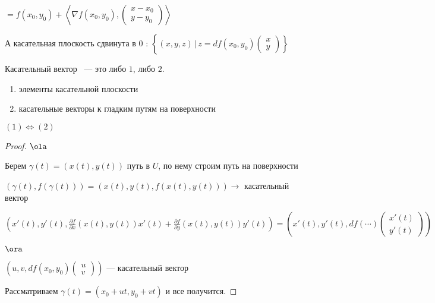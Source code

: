 $ = f(x_0, y_0) + \left \langle \nabla f(x_0, y_0), \begin{pmatrix}
    x - x_0 \\
    y - y_0
\end{pmatrix} \right \rangle$

А касательная плоскость сдвинута в 0 : $\left \{ (x, y, z) \, | \, z = df(x_0, y_0) \begin{pmatrix}
    x\\
    y
\end{pmatrix} \right \}$

\quad

\begin{definition}
    Касательный вектор ~--- это либо $1$, либо $2$.
   \begin{enumerate}
       \item элементы касательной плоскости
       \item касательные векторы к гладким путям на поверхности
    \end{enumerate}
\end{definition}

\begin{theorem}
    $(1) \Longleftrightarrow (2)$
\end{theorem}

\begin{proof}

    $\ola$ 

    Берем $\gamma(t) = (x(t), y(t))$ путь в $U$, по нему строим путь на поверхности 

    $(\gamma(t), f(\gamma(t))) = (x(t), y(t), f(x(t), y(t))) \rightarrow$ касательный вектор

    $(x'(t), y'(t), \frac{\partial f}{\partial x}(x(t), y(t)) x'(t) + \frac{\partial f}{\partial y} (x(t), y(t)) y'(t)) = (x'(t), y'(t), df(\cdots) \begin{pmatrix}
        x'(t)\\
        y'(t)
    \end{pmatrix})$

    $\ora$

    $(u, v, df(x_0, y_0)\begin{pmatrix}
        u\\
        v
    \end{pmatrix}) $ --- касательный вектор

    Рассматриваем $\gamma(t) = (x_0 + ut, y_0 + vt)$ и все получится.
\end{proof}

